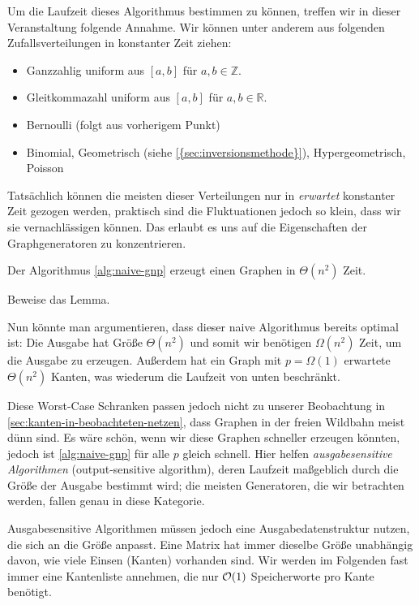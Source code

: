 Um  die Laufzeit dieses Algorithmus bestimmen zu können, treffen wir in dieser Veranstaltung folgende Annahme.
Wir können unter anderem aus folgenden Zufallsverteilungen in konstanter Zeit ziehen:
\begin{itemize}
    \item Ganzzahlig uniform aus $[a, b]$ für $a, b \in \mathbb{Z}$.
    \item Gleitkommazahl uniform aus $[a, b]$ für $a, b \in \mathbb{R}$.
    \item Bernoulli (folgt aus vorherigem Punkt)
    \item Binomial, Geometrisch (siehe \cref{{sec:inversionsmethode}}), Hypergeometrisch, Poisson
\end{itemize}

Tatsächlich können die meisten dieser Verteilungen nur in \emph{erwartet} konstanter Zeit gezogen werden, praktisch sind die Fluktuationen jedoch so klein, dass wir sie vernachlässigen können.
Das erlaubt es uns auf die Eigenschaften der Graphgeneratoren zu konzentrieren.

\begin{lemma}
    \label{lem:naive-gnp}
    Der Algorithmus \ref{alg:naive-gnp} erzeugt einen \Gnp Graphen in $\Theta(n^2)$ Zeit.
\end{lemma}

\begin{exercise}
    Beweise das Lemma.
\end{exercise}

Nun könnte man argumentieren, dass dieser naive Algorithmus bereits optimal ist:
Die Ausgabe hat Größe $\Theta(n^2)$ und somit wir benötigen $\Omega(n^2)$ Zeit, um die Ausgabe zu erzeugen.
Außerdem hat ein Graph mit $p=\Omega(1)$ erwartete $\Theta(n^2)$ Kanten, was wiederum die Laufzeit von unten beschränkt.

Diese Worst-Case Schranken passen jedoch nicht zu unserer Beobachtung in \cref{sec:kanten-in-beobachteten-netzen}, dass Graphen in der freien Wildbahn meist dünn sind.
Es wäre schön, wenn wir diese Graphen schneller erzeugen könnten, jedoch ist \cref{alg:naive-gnp} für alle $p$ gleich \glqq schnell\grqq.
Hier  helfen \emph{ausgabesensitive Algorithmen} (output-sensitive algorithm), deren Laufzeit maßgeblich durch die Größe der Ausgabe bestimmt wird;
die meisten Generatoren, die wir betrachten werden, fallen genau in diese Kategorie.

Ausgabesensitive  Algorithmen müssen jedoch eine Ausgabedatenstruktur nutzen, die sich an die Größe anpasst.
Eine Matrix hat immer dieselbe Größe unabhängig davon, wie viele Einsen (Kanten) vorhanden sind.
Wir werden im Folgenden fast immer eine Kantenliste annehmen, die nur $\mathcal{O}\!\left(1\right)$ Speicherworte pro Kante benötigt.

